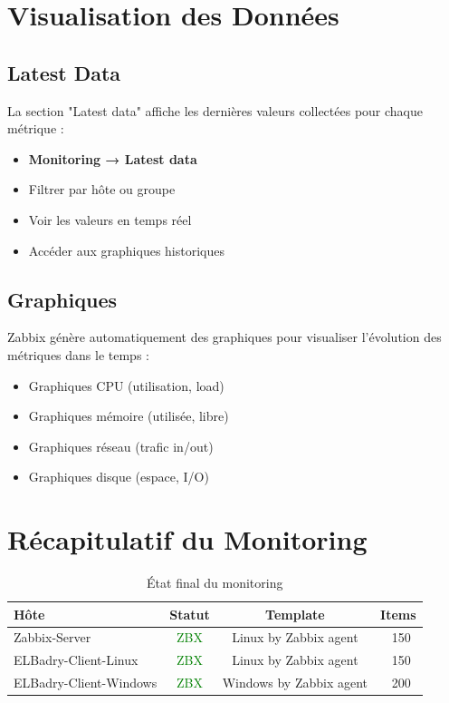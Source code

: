 \section{Visualisation des Données}

\subsection{Latest Data}

La section "Latest data" affiche les dernières valeurs collectées pour chaque métrique :

\begin{itemize}
    \item \textbf{Monitoring → Latest data}
    \item Filtrer par hôte ou groupe
    \item Voir les valeurs en temps réel
    \item Accéder aux graphiques historiques
\end{itemize}

\subsection{Graphiques}

Zabbix génère automatiquement des graphiques pour visualiser l'évolution des métriques dans le temps :

\begin{itemize}
    \item Graphiques CPU (utilisation, load)
    \item Graphiques mémoire (utilisée, libre)
    \item Graphiques réseau (trafic in/out)
    \item Graphiques disque (espace, I/O)
\end{itemize}

\section{Récapitulatif du Monitoring}

\begin{table}[H]
\centering
\caption{État final du monitoring}
\label{tab:monitoring-summary}
\begin{tabular}{|l|c|c|c|}
\hline
\textbf{Hôte} & \textbf{Statut} & \textbf{Template} & \textbf{Items} \\
\hline
Zabbix-Server & \textcolor{green}{ZBX} & Linux by Zabbix agent & ~150 \\
\hline
ELBadry-Client-Linux & \textcolor{green}{ZBX} & Linux by Zabbix agent & ~150 \\
\hline
ELBadry-Client-Windows & \textcolor{green}{ZBX} & Windows by Zabbix agent & ~200 \\
\hline
\end{tabular}
\end{table}

